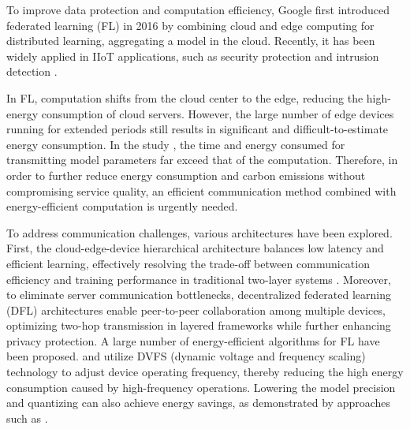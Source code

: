 \documentclass[journal]{IEEEtran}
\begin{document}


To improve data protection and computation efficiency, Google first introduced federated learning (FL) in 2016 \cite{fedavg_google} by combining cloud and edge computing for distributed learning, aggregating a model in the cloud. Recently, it has been widely applied in IIoT applications, such as security protection \cite{salim2024fl_securityguard} and intrusion detection \cite{rashid2023federated_invasion}. 

In FL, computation shifts from the cloud center to the edge, reducing the high-energy consumption of cloud servers. However, the large number of edge devices running for extended periods still results in significant and difficult-to-estimate energy consumption. In the study \cite{liu_hierarchical_2023}, the time and energy consumed for transmitting model parameters far exceed that of the computation. Therefore, in order to further reduce energy consumption and carbon emissions without compromising service quality, an efficient communication method combined with energy-efficient computation is urgently needed.

To address communication challenges, various architectures have been explored. First, the cloud-edge-device hierarchical architecture \cite{abdellatif2022communication_hierarchical,zhou2023hierarchical} balances low latency and efficient learning, effectively resolving the trade-off between communication efficiency and training performance in traditional two-layer systems \cite{liu_hierarchical_2023}. Moreover, to eliminate server communication bottlenecks, decentralized federated learning (DFL) architectures \cite{kalra2023decentralized,al2023decentralized_D2D} enable peer-to-peer collaboration among multiple devices, optimizing two-hop transmission in layered frameworks while further enhancing privacy protection. A large number of energy-efficient algorithms for FL have been proposed. \cite{rashid2023federated_invasion} and \cite{chen_eefl_2023} utilize DVFS (dynamic voltage and frequency scaling) technology to adjust device operating frequency, thereby reducing the high energy consumption caused by high-frequency operations. Lowering the model precision and quantizing can also achieve energy savings, as demonstrated by approaches such as \cite{de2023hed_quantize,chen2022energy_quantize}. 
\end{document}
